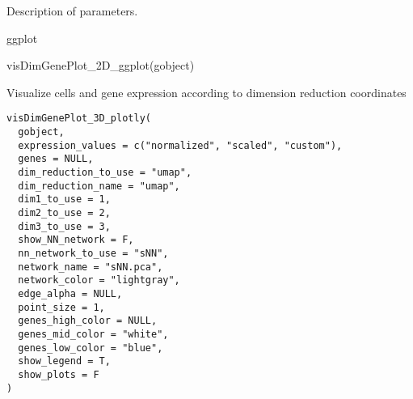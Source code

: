 \documentclass[a4paper]{book}
\begin{document}
%
\begin{Details}\relax
Description of parameters.
\end{Details}
%
\begin{Value}
ggplot
\end{Value}
%
\begin{Examples}
\begin{ExampleCode}
    visDimGenePlot_2D_ggplot(gobject)
\end{ExampleCode}
\end{Examples}
%
\begin{Description}\relax
Visualize cells and gene expression according to dimension reduction coordinates
\end{Description}
%
\begin{Usage}
\begin{verbatim}
visDimGenePlot_3D_plotly(
  gobject,
  expression_values = c("normalized", "scaled", "custom"),
  genes = NULL,
  dim_reduction_to_use = "umap",
  dim_reduction_name = "umap",
  dim1_to_use = 1,
  dim2_to_use = 2,
  dim3_to_use = 3,
  show_NN_network = F,
  nn_network_to_use = "sNN",
  network_name = "sNN.pca",
  network_color = "lightgray",
  edge_alpha = NULL,
  point_size = 1,
  genes_high_color = NULL,
  genes_mid_color = "white",
  genes_low_color = "blue",
  show_legend = T,
  show_plots = F
)
\end{verbatim}
\end{Usage}
%
\end{document}
